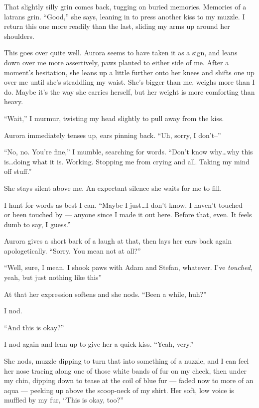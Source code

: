 That slightly silly grin comes back, tugging on buried memories. Memories of a latrans grin. ``Good,'' she says, leaning in to press another kiss to my muzzle. I return this one more readily than the last, sliding my arms up around her shoulders.

This goes over quite well. Aurora seems to have taken it as a sign, and leans down over me more assertively, paws planted to either side of me. After a moment's hesitation, she leans up a little further onto her knees and shifts one up over me until she's straddling my waist. She's bigger than me, weighs more than I do. Maybe it's the way she carries herself, but her weight is more comforting than heavy.

``Wait,'' I murmur, twisting my head slightly to pull away from the kiss.

Aurora immediately tenses up, ears pinning back. ``Uh, sorry, I don't--''

``No, no. You're fine,'' I mumble, searching for words. ``Don't know why\ldots{}why this is\ldots{}doing what it is. Working. Stopping me from crying and all. Taking my mind off stuff.''

She stays silent above me. An expectant silence she waits for me to fill.

I hunt for words as best I can. ``Maybe I just\ldots{}I don't know. I haven't touched --- or been touched by --- anyone since I made it out here. Before that, even. It feels dumb to say, I guess.''

Aurora gives a short bark of a laugh at that, then lays her ears back again apologetically. ``Sorry. You mean not at all?''

``Well, sure, I mean. I shook paws with Adam and Stefan, whatever. I've \emph{touched}, yeah, but just nothing like this''

At that her expression softens and she nods. ``Been a while, huh?''

I nod.

``And this is okay?''

I nod again and lean up to give her a quick kiss. ``Yeah, very.''

She nods, muzzle dipping to turn that into something of a nuzzle, and I can feel her nose tracing along one of those white bands of fur on my cheek, then under my chin, dipping down to tease at the coil of blue fur --- faded now to more of an aqua --- peeking up above the scoop-neck of my shirt. Her soft, low voice is muffled by my fur, ``This is okay, too?''

